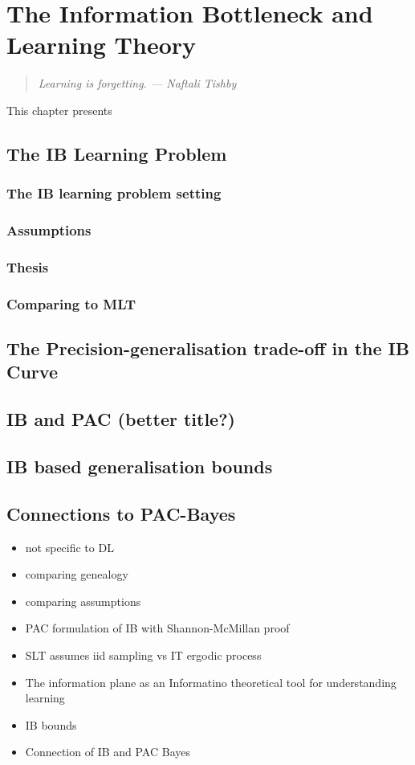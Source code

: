 

\chapter{The Information Bottleneck and Learning Theory}\label{ch:ib_and_lt}

\begin{quotation}
	\small \textit{ \flushright
	Learning is forgetting.
	\flushright --- Naftali Tishby \\
	\vspace{1cm}}
\end{quotation}


This chapter presents
\section{The IB Learning Problem}
\subsection{The IB learning problem setting}
\subsection{Assumptions}
\subsection{Thesis}
\subsection{Comparing to MLT}
\section{The Precision-generalisation trade-off in the IB Curve}
\section{IB and PAC (better title?)}
\section{IB based generalisation bounds}
\section{Connections to PAC-Bayes}
\begin{itemize}
	\item not specific to DL
	\item comparing genealogy
	\item comparing assumptions
	\item PAC formulation of IB with Shannon-McMillan proof
	\item SLT assumes iid sampling vs IT ergodic process
	\item The information plane as an Informatino theoretical tool for understanding learning
	\item IB bounds
	\item Connection of IB and PAC Bayes
\end{itemize}
